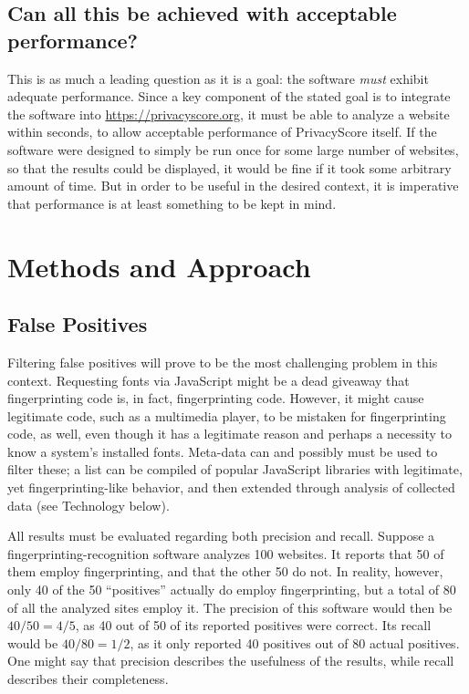 \documentclass[
    fontsize=12pt,
    headings=small,
    parskip=half,
    bibliography=totoc,
    numbers=noenddot,
    open=any
    ]{scrreprt}
\begin{document}
\section{Can all this be achieved with acceptable performance?}
This is as much a leading question as it is a goal: the software \textit{must} exhibit adequate performance.
Since a key component of the stated goal is to integrate the software into \url{https://privacyscore.org},
it must be able to analyze a website within seconds, to allow acceptable performance of PrivacyScore itself.
If the software were designed to simply be run once for some large number of websites, so that the results
could be displayed, it would be fine if it took some arbitrary amount of time. But in order to be useful
in the desired context, it is imperative that performance is at least something to be kept in mind.


\begingroup
\renewcommand{\cleardoublepage}{}
\renewcommand{\clearpage}{}
\chapter{Methods and Approach} %
\endgroup

\section{False Positives}
Filtering false positives will prove to be the most challenging problem in this context.
Requesting fonts via JavaScript might be a dead giveaway
that fingerprinting code is, in fact, fingerprinting code. However, it might cause legitimate code, such
as a multimedia player, to be mistaken for fingerprinting code, as well, even though it has a legitimate
reason and perhaps a necessity to know a system's installed fonts.
Meta-data can and possibly must be used to filter these; a list can be compiled of popular JavaScript libraries with legitimate,
yet fingerprinting-like behavior, and then extended through analysis of collected data (see Technology below).

All results must be evaluated regarding both precision and recall. Suppose a fingerprinting-recognition software
analyzes 100 websites. It reports that 50 of them employ fingerprinting, and that the other 50 do not.
In reality, however, only 40 of the 50 ``positives'' actually do employ fingerprinting, but a total
of 80 of all the analyzed sites employ it.
The precision of this software would then be $40/50 = 4/5$, as 40 out of 50 of its reported positives were correct.
Its recall would be $40/80 = 1/2$, as it only reported 40 positives out of 80 actual positives.
One might say that precision describes the usefulness of the results, while recall describes their completeness.
\end{document}
